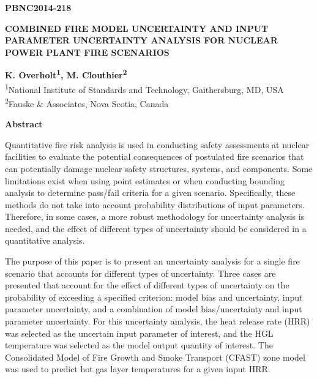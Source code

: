 \documentclass[12pt]{article}
\begin{document}
\begin{flushright}
\textbf{PBNC2014-218}
\end{flushright}

\begin{center}
\textbf{COMBINED FIRE MODEL UNCERTAINTY AND INPUT PARAMETER UNCERTAINTY ANALYSIS FOR NUCLEAR POWER PLANT FIRE SCENARIOS}
\end{center}

\begin{center}
\textbf{K. Overholt\textsuperscript{1}, M. Clouthier\textsuperscript{2}}\\
\textsuperscript{1}National Institute of Standards and Technology, Gaithersburg, MD, USA\\
\textsuperscript{2}Fauske \& Associates, Nova Scotia, Canada
\end{center}

\begin{center}
\textbf{Abstract}
\end{center}

\linenumbers 
 
Quantitative fire risk analysis is used in conducting safety assessments at nuclear facilities to evaluate the potential consequences of postulated fire scenarios that can potentially damage nuclear safety structures, systems, and components. Some limitations exist when using point estimates or when conducting bounding analysis to determine pass/fail criteria for a given scenario. Specifically, these methods do not take into account probability distributions of input parameters. Therefore, in some cases, a more robust methodology for uncertainty analysis is needed, and the effect of different types of uncertainty should be considered in a quantitative analysis.

The purpose of this paper is to present an uncertainty analysis for a single fire scenario that accounts for different types of uncertainty. Three cases are presented that account for the effect of different types of uncertainty on the probability of exceeding a specified criterion: model bias and uncertainty, input parameter uncertainty, and a combination of model bias/uncertainty and input parameter uncertainty. For this uncertainty analysis, the heat release rate (HRR) was selected as the uncertain input parameter of interest, and the HGL temperature was selected as the model output quantity of interest. The Consolidated Model of Fire Growth and Smoke Transport (CFAST) zone model was used to predict hot gas layer temperatures for a given input HRR.
\end{document}

